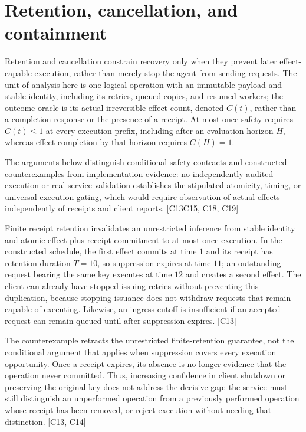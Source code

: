 \documentclass[11pt]{article}
\begin{document}
\section{Retention, cancellation, and containment}
Retention and cancellation constrain recovery only when they prevent later effect-capable execution, rather than merely stop the agent from sending requests. The unit of analysis here is one logical operation with an immutable payload and stable identity, including its retries, queued copies, and resumed workers; the outcome oracle is its actual irreversible-effect count, denoted $C(t)$, rather than a completion response or the presence of a receipt. At-most-once safety requires $C(t)\leq 1$ at every execution prefix, including after an evaluation horizon $H$, whereas effect completion by that horizon requires $C(H)=1$.

The arguments below distinguish conditional safety contracts and constructed counterexamples from implementation evidence: no independently audited execution or real-service validation establishes the stipulated atomicity, timing, or universal execution gating, which would require observation of actual effects independently of receipts and client reports. [C13\textendash{}C15, C18, C19]

Finite receipt retention invalidates an unrestricted inference from stable identity and atomic effect-plus-receipt commitment to at-most-once execution. In the constructed schedule, the first effect commits at time $1$ and its receipt has retention duration $T=10$, so suppression expires at time $11$; an outstanding request bearing the same key executes at time $12$ and creates a second effect. The client can already have stopped issuing retries without preventing this duplication, because stopping issuance does not withdraw requests that remain capable of executing. Likewise, an ingress cutoff is insufficient if an accepted request can remain queued until after suppression expires. [C13]

The counterexample retracts the unrestricted finite-retention guarantee, not the conditional argument that applies when suppression covers every execution opportunity. Once a receipt expires, its absence is no longer evidence that the operation never committed. Thus, increasing confidence in client shutdown or preserving the original key does not address the decisive gap: the service must still distinguish an unperformed operation from a previously performed operation whose receipt has been removed, or reject execution without needing that distinction. [C13, C14]
\end{document}
